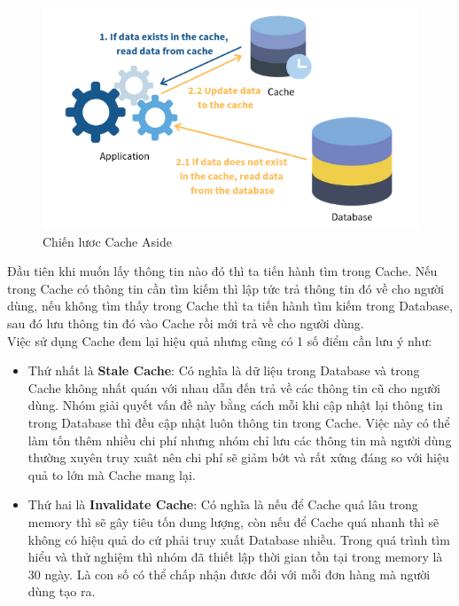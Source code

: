             \begin{figure}[H]
			\includegraphics[width=1\textwidth]{Images/problem2.png}
			\centering
			\linebreak
			\caption{Chiến lươc Cache Aside\cite{cachestrategy}}
	       	\end{figure}
	       	
	        Đầu tiên khi muốn lấy thông tin nào đó thì ta tiến hành tìm trong Cache. Nếu trong Cache có thông tin cần tìm kiếm thì lập tức trả thông tin đó về cho người dùng, nếu không tìm thấy trong Cache thì ta tiến hành tìm kiếm trong Database, sau đó lưu thông tin đó vào Cache rồi mới trả về cho người dùng.\\
	        
	        Việc sử dụng Cache đem lại hiệu quả nhưng cũng có 1 số điểm cần lưu ý như:
	         \begin{itemize}
                \item Thứ nhất là \textbf{Stale Cache}: Có nghĩa là dữ liệu trong Database và trong Cache không nhất quán với nhau dẫn đến trả về các thông tin cũ cho người dùng. Nhóm giải quyết vấn đề này bằng cách mỗi khi cập nhật lại thông tin trong Database thì đều cập nhật luôn thông tin trong Cache. Việc này có thể làm tốn thêm nhiều chi phí nhưng nhóm chỉ lưu các thông tin mà người dùng thường xuyên truy xuât nên chi phí sẽ giảm bớt và rất xứng đáng so với hiệu quả to lớn mà Cache mang lại.
                \item Thứ hai là \textbf{Invalidate Cache}: Có nghĩa là nếu để Cache quá lâu trong memory thì sẽ gây tiêu tốn dung lượng, còn nếu để Cache quá nhanh thì sẽ không có hiệu quả do cứ phải truy xuất Database nhiều. Trong quá trình tìm hiểu và thử nghiệm thì nhóm đã thiết lập thời gian tồn tại trong memory là 30 ngày. Là con số có thể chấp nhận đươc đối với mỗi đơn hàng mà người dùng tạo ra.
            \end{itemize}
            

